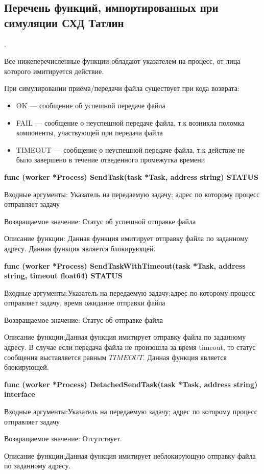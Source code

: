 \subsection{Перечень функций, импортированных при симуляции СХД Татлин}.

Все нижеперечисленные функции обладают указателем на процесс, от лица которого имитируется действие.

При симулировании приёма/передачи файла существует при кода возврата:
\begin{itemize}
\item OK --- сообщение об успешной передаче файла
\item FAIL --- сообщение о неуспешной передаче файла, т.к возникла поломка компоненты, участвующей при передача файла
\item TIMEOUT --- сообщение о неуспешной передаче файла, т.к действие не было завершено в течение отведенного промежутка времени
\end{itemize}  

\textbf{func (worker *Process) SendTask(task *Task, address string) STATUS}

Входные аргументы: Указатель на передаемую задачу; адрес по которому процесс отправляет  задачу

Возвращаемое значение: Статус об успешной отправке файла

Описание функции: Данная функция имитирует отправку файла по заданному адресу. Данная функция является блокирующей. 

\textbf{func (worker *Process) SendTaskWithTimeout(task *Task, address string, timeout float64) STATUS}

Входные аргументы:Указатель на передаемую задачу;адрес по которому процесс отправляет  задачу, время ожидание отправки файла

Возвращаемое значение: Статус об отправке файла

Описание функции:Данная функция имитирует отправку файла по заданному адресу. В случае если передача файла не произошла за время timeout, то статус сообщения выставляется равным $TIMEOUT$. Данная функция является блокирующей. 

\textbf{func (worker *Process) DetachedSendTask(task *Task, address string) interface}


Входные аргументы:Указатель на передаемую задачу; адрес по которому процесс отправляет  задачу

Возвращаемое значение: Отсутствует.

Описание функции:Данная функция имитирует неблокирующую отправку файла по заданному адресу.

